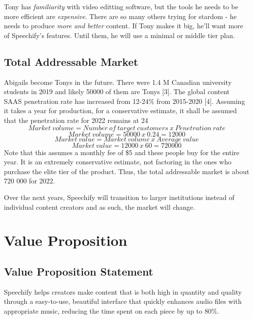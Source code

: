\documentclass[letterpaper]{article}
\begin{document}
        Tony has \emph{familiarity} with video editting software, but the tools he needs to be more efficient are \emph{expensive}. There are so many others trying for stardom - he needs to produce \emph{more and better} content. If Tony makes it big, he'll want more of Speechify's features. Until them, he will use a minimal or middle tier plan.

    \subsection{Total Addressable Market}
    Abigails become Tonys in the future. There were 1.4 M Canadian university students in 2019 and likely 50000 of them are Tonys [3]. The global content SAAS penetration rate has increased from 12-24\% from 2015-2020 [4]. Assuming it takes a year for production, for a conservative estimate, it shall be assumed that the penetration rate for 2022 remains at 24%
    \[ Market\: volume = Number\: of\: target\: customers\: x\: Penetration\: rate \]
    \[ Market\: volume = 50 000\: x\: 0.24 = 12 000 \]
    \[ Market\: value = Market\: volume\: x\: Average\: value \]
    \[ Market\: value = 12 000\: x\: 60 = 720 000 \]
    Note that this assumes a monthly fee of \$5 and these people buy for the entire year. It is an extremely conservative estimate, not factoring in the ones who purchase the elite tier of the product. Thus, the total addressable market is about 720 000 for 2022.
    \par
    Over the next years, Speechify will transition to larger institutions instead of individual content creators and as such, the market will change.
\section{Value Proposition}
    \subsection{Value Proposition Statement}
        Speechify helps creators make content that is both high in quantity and quality through a easy-to-use, beautiful interface that quickly enhances audio files with appropriate music, reducing the time spent on each piece by up to 80\%.
\end{document}
